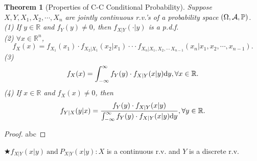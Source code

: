 \documentclass[openany,12pt]{book}
\newtheorem{theorem}{Theorem}[chapter]
\begin{document}
\begin{theorem}[Properties of C-C Conditional Probability]
  Suppose $X,Y,X_{1}, X_{2}, \cdots,X_{n}$ are jointly continuous r.v.'s of a probability space $(\Omega,\mathcal{A},\mathbb{P})$.\\
  (1) If $y \in \mathbb{R}$ and $f_{Y}(y) \neq 0$, then $f_{X|Y}\left( \cdot | y \right)$ is a p.d.f.\\
  (2) $\forall x \in \mathbb{R}^{n}$,
  \[
    f_{X}(x)= f_{X_{1}}(x_{1}) \cdot f_{X_{2}|X_{1}}\left( x_{2}|x_{1} \right) \cdot \cdot \cdot f_{X_{n}|X_{1},X_{2}, \cdots\,X_{n - 1}}\left( x_{n}|x_{1},x_{2}, \cdots,x_{n - 1} \right).
  \]
  (3)
  \[
    f_{X}(x)= \int_{- \infty}^{\infty}{f_{Y}(y) \cdot f_{X|Y}(x|y)}\mathrm{d} y,\forall x \in \mathbb{R}.\]
  (4) If $x \in \mathbb{R}$ and $f_{X}(x) \neq 0$, then
  \[
    f_{Y|X}(y|x)= \frac{f_{Y}(y) \cdot f_{X|Y}(x|y)}{\int_{- \infty}^{\infty}{f_{Y}(y) \cdot f_{X|Y}(x|y)\mathrm{d} y}},\forall y \in \mathbb{R}.
  \]
\end{theorem}

\begin{proof}
  abc
\end{proof}

$\bigstar f_{X|Y}(x|y) ~\text{and}~ P_{X|Y}(x|y): X$ is a continuous r.v. and $Y$ is a discrete r.v.
\end{document}
